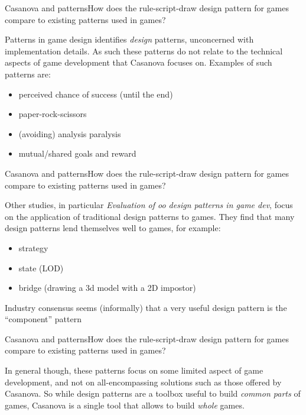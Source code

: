 \documentclass{beamer}
\begin{document}
\begin{slide}{Casanova and patterns}{How does the rule-script-draw design pattern for games compare to existing patterns used in games?}{
\item Patterns in game design identifies \textit{design} patterns, unconcerned with implementation details. As such these patterns do not relate to the technical aspects of game development that Casanova focuses on. Examples of such patterns are:
\begin{itemize}
\item perceived chance of success (until the end)
\item paper-rock-scissors
\item (avoiding) analysis paralysis
\item mutual/shared goals and reward
\end{itemize}
}\end{slide}
\begin{slide}{Casanova and patterns}{How does the rule-script-draw design pattern for games compare to existing patterns used in games?}{
\item Other studies, in particular \textit{Evaluation of oo design patterns in game dev}, focus on the application of traditional design patterns to games. They find that many design patterns lend themselves well to games, for example:
\begin{itemize}
\item strategy
\item state (LOD)
\item bridge (drawing a 3d model with a 2D impostor)
\end{itemize}
\item Industry consensus seems (informally) that a very useful design pattern is the ``component'' pattern
}\end{slide}
\begin{slide}{Casanova and patterns}{How does the rule-script-draw design pattern for games compare to existing patterns used in games?}{
\item In general though, these patterns focus on some limited aspect of game development, and not on all-encompassing solutions such as those offered by Casanova. So while design patterns are a toolbox useful to build \textit{common parts} of games, Casanova is a single tool that allows to build \textit{whole} games.
}\end{slide}
\end{document}
